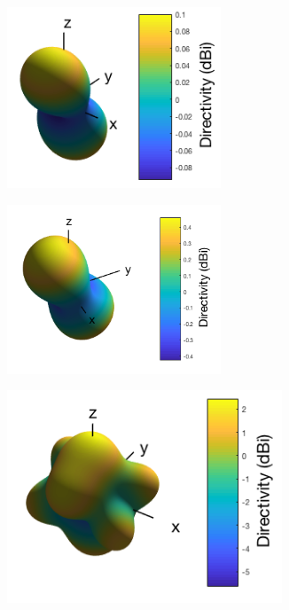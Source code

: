 \begin{figure}[H]
\centering
\begin{subfigure}{.5\textwidth}
    \centering
        \includegraphics[width=0.7\textwidth]{Figures/regulartetra50hzdirectivity.png}
    \label{fig:directivity200hzregulartetra}
\end{subfigure}%
\begin{subfigure}{.5\textwidth}
        \includegraphics[width=0.7\textwidth]{Figures/regulartetra100hzdirectivity.png}
    \label{fig:directivity100hzregulartetra}
\end{subfigure}
\begin{subfigure}{.5\textwidth}
    \centering
        \includegraphics[width=0.9\textwidth]{Figures/regulartetra200hzdirectivity.png}

\end{subfigure}
\end{figure}
